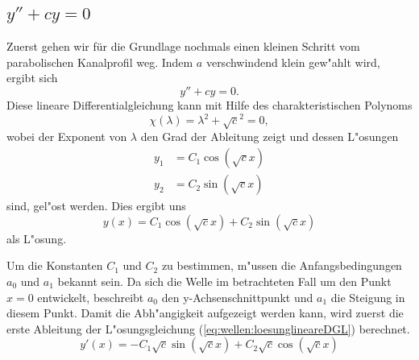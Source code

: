 \subsection{\texorpdfstring{$y''+cy = 0$}{y''+cy = 0}}
Zuerst gehen wir für die Grundlage nochmals einen kleinen Schritt vom 
parabolischen Kanalprofil weg. Indem $a$ verschwindend klein gew"ahlt wird, 
ergibt sich
\begin{equation}
	y''+ cy = 0.
	\label{eq:wellen:lineareDGL}
\end{equation}
Diese lineare Differentialgleichung kann mit Hilfe des charakteristischen 
Polynoms
\begin{equation*}
	\chi(\lambda) = \lambda^2+\sqrt{c}^2 = 0,
\end{equation*}
wobei der Exponent von $\lambda$ den Grad der Ableitung zeigt und dessen 
L"osungen
\begin{equation*}
	\begin{split}
		y_1 &= C_1\cos(\sqrt{c} x) \\
		y_2 &= C_2\sin(\sqrt{c} x)
	\end{split}
\end{equation*}
sind, gel"ost werden. Dies ergibt uns
\begin{equation}
	y(x) = C_1 \cos(\sqrt{c}x) + C_2 \sin(\sqrt{c}x)
	\label{eq:wellen:loesunglineareDGL}
\end{equation}
als L"osung.

Um die Konstanten $C_1$ und $C_2$ zu bestimmen, m"ussen die Anfangsbedingungen 
$a_0$ und $a_1$ bekannt sein. Da sich die Welle im betrachteten Fall um den 
Punkt $x=0$ entwickelt, beschreibt $a_0$ den y-Achsenschnittpunkt und $a_1$ die 
Steigung in diesem Punkt. Damit die Abh"angigkeit aufgezeigt werden kann, wird 
zuerst die erste Ableitung der L"osungsgleichung 
(\ref{eq:wellen:loesunglineareDGL}) berechnet.
\begin{equation*}
	y'(x)=-C_1 \sqrt{c} \sin(\sqrt{c}x) + C_2 \sqrt{c} \cos(\sqrt{c}x)
\end{equation*}

